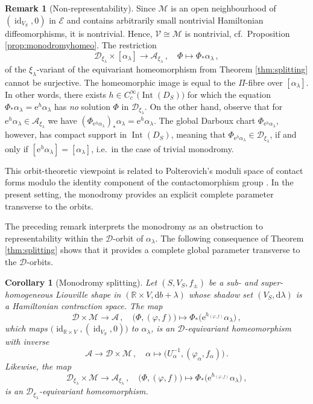 \documentclass{amsart}
\newtheorem{cor}[prop]{Corollary}
\theoremstyle{definition}
\newtheorem{rem}[prop]{Remark}
\newcommand{\AAA}{\mathcal A}
\newcommand{\rmd}{\mathrm d}
\newcommand{\DD}{\mathcal D}
\newcommand{\rme}{\mathrm e}
\newcommand{\EE}{\mathcal E}
\newcommand{\MM}{\mathcal M}
\newcommand{\R}{\mathbb R}
\newcommand{\VV}{\mathcal V}
\newcommand{\lra}{\longrightarrow}
\DeclareMathOperator{\id}{\mathrm{id}}
\DeclareMathOperator{\Int}{\mathrm{Int}}
\begin{document}
\begin{rem}[Non-representability]
\label{rem:non-representability}
Since $\MM$ is an open neighbourhood of
$(\id_{V_S},0)$ in $\EE$
and contains arbitrarily small nontrivial
Hamiltonian diffeomorphisms,
it is nontrivial.
Hence, $\VV\cong\MM$ is nontrivial,
cf.\ Proposition \ref{prop:monodromyhomeo}.
The restriction
  \[
  \DD_{\xi_{\lambda}}\times
  [\alpha_{\lambda}]
  \lra\AAA_{\xi_{\lambda}}
  \,,
  \quad
  \Phi\longmapsto
  \Phi_*\alpha_{\lambda}
  \,,
  \]
of the $\xi_{\lambda}$-variant
of the equivariant homeomorphism from
Theorem \ref{thm:splitting} cannot be surjective.
The homeomorphic image is equal
to the $\Pi$-fibre over $[\alpha_{\lambda}]$.
In other words,
there exists $h\in C_c^{\infty}\big(\Int(D_S)\big)$
for which the equation
$\Phi_*\alpha_{\lambda}=\rme^h\alpha_{\lambda}$
has {\it no} solution $\Phi$ in $\DD_{\xi_{\lambda}}$.
On the other hand,
observe that for
$\rme^h\alpha_{\lambda}\in\AAA_{\xi_{\lambda}}$
we have
$(\Phi_{\rme^h\alpha_{\lambda}})_*\alpha_{\lambda}=\rme^h\alpha_{\lambda}$.
The global Darboux chart
$\Phi_{\rme^h\alpha_{\lambda}}$,
however,
has compact support in $\Int(D_S)$,
meaning that
$\Phi_{\rme^h\alpha_{\lambda}}\in\DD_{\xi_{\lambda}}$,
if and only if $[\rme^h\alpha_{\lambda}]=[\alpha_{\lambda}]$,
i.e.\ in the case of trivial monodromy.

This orbit-theoretic viewpoint
is related to Polterovich's moduli space of contact forms
modulo the identity component of the contactomorphism group
\cite[Section~3]{pol02}.
In the present setting,
the monodromy provides an explicit complete parameter
transverse to the orbits.
\end{rem}


The preceding remark interprets the monodromy
as an obstruction to representability within the
$\DD$-orbit of $\alpha_{\lambda}$.
The following consequence of
Theorem \ref{thm:splitting}
shows that it provides a complete global parameter
transverse to the $\DD$-orbits.


\begin{cor}[Monodromy splitting]
\label{cor:monodromysplitting}
Let $(S,V_S,f_{\pm})$ be a sub- and super-homogeneous
Liouville shape in $(\R\times V,\rmd b+\lambda)$
whose shadow set $(V_S,\rmd\lambda)$
is a Hamiltonian contraction space.
The map
\[
\DD\times\MM\lra\AAA
\,,
\quad
\bigl(\Phi,(\varphi,f)\bigr)
\longmapsto
\Phi_*\bigl(
\rme^{h_{(\varphi,f)}}\alpha_{\lambda}
\bigr)
\,,
\]
which maps $\big(\id_{\R\times V},(\id_{V_S},0)\big)$
to $\alpha_{\lambda}$,
is an $\DD$-equivariant homeomorphism
with inverse
\[
\AAA\lra\DD\times\MM
\,,
\quad
\alpha\longmapsto
\bigl(
U_{\alpha}^{-1},
(\varphi_{\alpha},f_{\alpha})
\bigr)
\,.
\]
Likewise, the map
\[
\DD_{\xi_{\lambda}}\times\MM
\lra
\AAA_{\xi_{\lambda}}
\,,
\quad
\bigl(\Phi,(\varphi,f)\bigr)
\longmapsto
\Phi_*\bigl(
\rme^{h_{(\varphi,f)}}\alpha_{\lambda}
\bigr)
\,,
\]
is an $\DD_{\xi_{\lambda}}$-equivariant
homeomorphism.
\end{cor}
\end{document}
